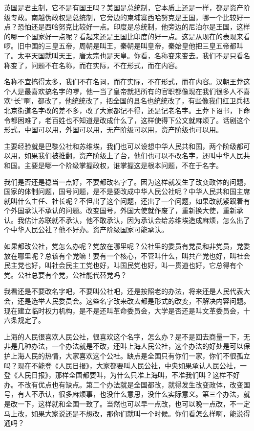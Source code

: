 英国是君主制，它不是有国王吗？美国是总统制，它本质上还是一样，都是资产阶级专政。南越伪政权是总统制，它旁边的柬埔寨西哈努克是王国，哪一个比较好一点？恐怕还是西哈努克比较好一点。印度是总统制，他旁边的尼泊尔是王国，这样的哪一个国家好一点呢？看起来还是王国比印度的好一点。这是从现在的表现来看啰。旧中国的三皇五帝，周朝是叫王，秦朝是叫皇帝，秦始皇他把三皇五帝都叫了。太平天国就叫天王，唐太宗也是天皇。你看，名称变来变去。我们不是只看名称变了，问题不在名称，而在实际，不在形式，而在内容。

名称不宜搞得太多，我们不在名词，而在实际，不在形式，而在内容。汉朝王莽这个人是最喜欢搞名字的啰，他一当了皇帝就把所有的官职都像现在我们很多人不喜欢“长”啊，都改了，他统统改了，把全国的县名也统统改了，有些像我们红卫兵把北京街道名字改的差不多，改了大家都记不得，还是记老名字。王莽下诏书，下命令都困难了，老百姓也不知道是改成什么了，这样使得下公文就麻烦了。话剧这个形式，中国可以用，外国可以用，无产阶级可以用，资产阶级也可以用。

主要经验就是巴黎公社和苏维埃，我们也可以设想中华人民共和国，两个阶级都可以用，如果我们被推翻，资产阶级上了台，他们也可以不改名字，还叫中华人民共和国。主要是哪一个阶级掌握政权，谁掌握这是根本问题，不在于名字。

我们是否还是稳当一点好，不要都改名字了。因为这样就发生了改变政体的问题，国家的体制问题，国号问题，是不是要改成中华人民公社呢？中华人民共和国主席就叫什么主任、社长呢？不但出了这个问题，还出了一个问题，如果改就紧跟着有个外国承认不承认的问题。改变国号，外国大使就作废了，重新换大使，重新承认。我估计苏联就不承认，他不敢承认，因为承认会给苏维埃造成麻烦，怎么出了个中华人民公社？他不好办。资产阶级国家可能承认。

如果都改公社，党怎么办呢？党放在哪里呢？公社里的委员有党员和非党员，党委放在哪里呢？总该有个党嘛！要有一个核心，不管叫什么，叫共产党也好，叫社会民主党也好，叫社会民主工党也好，叫国民党也好，叫一贯道也好，它总得有个党。公社总要有个党，公社能代替党吗？

我看还是不要改名字吧，不要叫公社吧，还是按照老的办法，将来还是人民代表大会，还是选举人民委员会。这些名字改来改去都是形式的改变，不解决内容问题。现在建立临时权力机构，是不是还叫革命委员会，大学是否还是叫文革委员会，十六条规定了。

上海的人民很喜欢人民公社，很喜欢这个名字，怎么办？是不是回去商量一下，无非是几种办法，一个办法就是不改，还叫上海人民公社，这个办法的好处是可以保护上海人民的热情，大家喜欢这个公社。缺点是全国只有你们一家，你们不很孤立吗？现在不能登《人民日报》，大家都要叫人民公社，中央如果承认人民公社，一登《人民日报》，那样全国都要叫，为什么只准上海叫，不准我们叫？这样不好办。不改有优点也有缺点。第二个办法就是全国都改，就得发生改变政体，改变国号，有人不承认，很多麻烦事，也没什么意思，没什么实际意义。第三个办法，就是改一下，这样就和全国一致了。当然也可以早一点改，也可以晚一点改，不一定马上改，如果大家说还是不想改，那你们就叫一个时候。你们看怎么样啊，能说得通吗？

